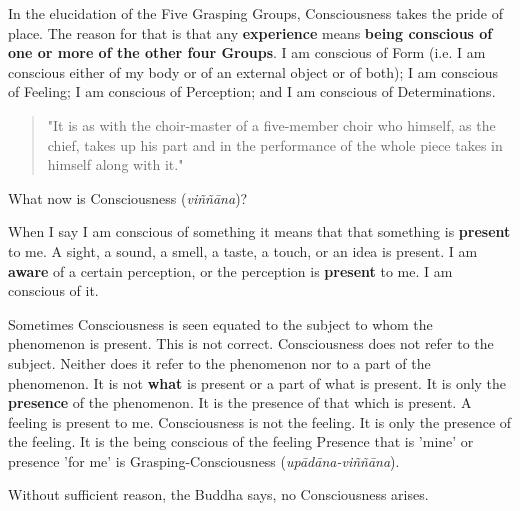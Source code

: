 In the elucidation of the Five Grasping Groups, Consciousness takes the
pride of place. The reason for that is that any \textbf{experience} means
\textbf{being conscious of one or more of the other four Groups}. I am
conscious of Form (i.e. I am conscious either of my body or of an
external object or of both); I am conscious of Feeling; I am conscious
of Perception; and I am conscious of Determinations.


\begin{quotation}
"It is as with the
choir-master of a five-member choir who himself, as the chief, takes up
his part and in the performance of the whole piece takes in himself
along with it."


\end{quotation}

What now is Consciousness (\emph{viññāna})?


When I say I am conscious of something it means that that something is
\textbf{present} to me. A sight, a sound, a smell, a taste, a touch, or an idea
is present. I am \textbf{aware} of a certain perception, or the perception is
\textbf{present} to me. I am conscious of it.


Sometimes Consciousness is seen equated to the subject to whom the
phenomenon is present. This is not correct. Consciousness does not refer
to the subject. Neither does it refer to the phenomenon nor to a part of
the phenomenon. It is not \textbf{what} is present or a part of what is
present. It is only the \textbf{presence} of the phenomenon. It is the presence
of that which is present. A feeling is present to me. Consciousness is
not the feeling. It is only the presence of the feeling. It is the being
conscious of the feeling Presence that is 'mine' or presence 'for me' is
Grasping-Consciousness (\emph{upādāna-viññāna}).


Without sufficient reason, the Buddha says, no Consciousness arises.


